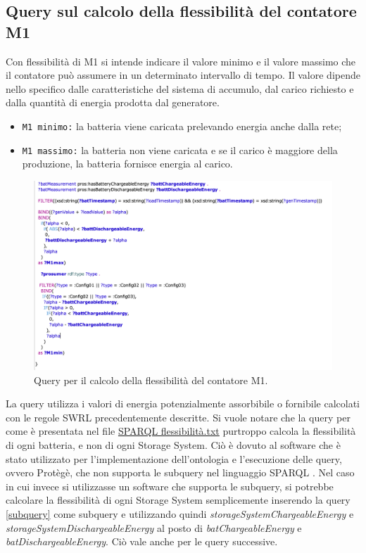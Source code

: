 \subsection{Query sul calcolo della flessibilità del contatore M1}

Con flessibilità di M1 si intende indicare il valore minimo e il valore massimo che il contatore può assumere in un determinato intervallo di tempo.
Il valore dipende nello specifico dalle caratteristiche del sistema di accumulo, dal carico richiesto e dalla quantità di energia prodotta dal generatore.
\begin{itemize}
    \item \texttt{M1 minimo:} la batteria viene caricata prelevando energia anche dalla rete;
    \item \texttt{M1 massimo:} la batteria non viene caricata e se il carico è maggiore della produzione, la batteria fornisce energia al carico.
\end{itemize}

\begin{figure}[H]
    \centering
    \includegraphics[width=15cm]{images/query_flessibilita.png}
    \caption{Query per il calcolo della flessibilità del contatore M1.}
    \label{fig:query_flessibilita}
\end{figure}

La query utilizza i valori di energia potenzialmente assorbibile o fornibile calcolati con le regole SWRL precedentemente descritte.
Si vuole notare che la query per come è presentata nel file \href{https://github.com/19eddie/SemanticWeb-Assignment02-03/blob/main/SPARQL%20flessibilit%C3%A0.txt}{SPARQL flessibilità.txt} 
purtroppo calcola la flessibilità di ogni batteria, e non di ogni Storage System.
Ciò è dovuto al software che è stato utilizzato per l'implementazione dell'ontologia e l'esecuzione delle query, ovvero Protègè,
che non supporta le subquery nel linguaggio SPARQL \cite{issueprotege}.
Nel caso in cui invece si utilizzasse un software che supporta le subquery, si potrebbe calcolare la flessibilità di ogni Storage System semplicemente inserendo la query \ref{subquery} come subquery e utilizzando quindi \textit{storageSystemChargeableEnergy} e \textit{storageSystemDischargeableEnergy} al posto di \textit{batChargeableEnergy} e \textit{batDischargeableEnergy}.
Ciò vale anche per le query successive.

